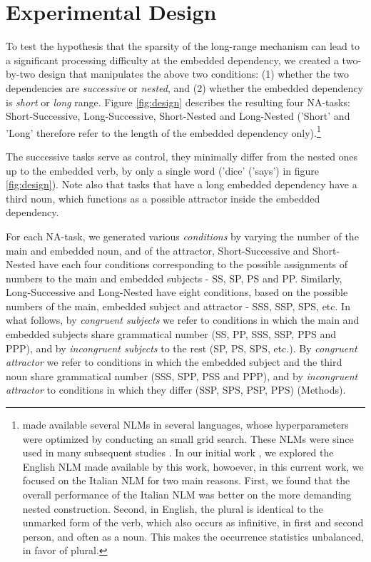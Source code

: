 \section{Experimental Design}
To test the hypothesis that the sparsity of the long-range mechanism can lead to a significant processing difficulty at the embedded dependency, we created a two-by-two design that manipulates the above two conditions: (1) whether the two dependencies are \textit{successive} or \textit{nested}, and (2) whether the embedded dependency is \textit{short} or \textit{long} range. Figure \ref{fig:design} describes the resulting four NA-tasks: Short-Successive, Long-Successive, Short-Nested and Long-Nested ('Short' and 'Long' therefore refer to the length of the embedded dependency only).\footnote{\citet{Gulordava:etal:2018} made available several NLMs in several languages, whose hyperparameters were optimized by conducting an small grid search. 
These NLMs were since used in many subsequent studies \citep{}. In our initial work \citep{lakretz2019emergence}, we explored the English NLM made available by this work, howoever, in this current work, we focused on the Italian NLM for two main reasons. First, we found that the overall performance of the Italian NLM was better on the more demanding nested construction. Second, in English, the plural is identical to the unmarked form of the verb, which also occurs as infinitive, in first and second person, and often as a noun. This makes the occurrence statistics unbalanced, in favor of plural.} 

The successive tasks serve as control, they minimally differ from the nested ones up to the embedded verb, by only a single word ('dice' ('says') in figure \ref{fig:design}). Note also that tasks that have a long embedded dependency have a third noun, which functions as a possible attractor inside the embedded dependency.

For each NA-task, we generated various \textit{conditions} by varying the number of the main and embedded noun, and of the attractor, Short-Successive and Short-Nested have each four conditions corresponding to the possible assignments of numbers to the main and embedded subjects - SS, SP, PS and PP. Similarly, Long-Successive and Long-Nested have eight conditions, based on the possible numbers of the main, embedded subject and attractor - SSS, SSP, SPS, etc. In what follows, by \textit{congruent subjects} we refer to conditions in which the main and embedded subjects share grammatical number (SS, PP, SSS, SSP, PPS and PPP), and by \textit{incongruent subjects} to the rest (SP, PS, SPS, etc.). By \textit{congruent attractor} we refer to conditions in which the embedded subject and the third noun share grammatical number (SSS, SPP, PSS and PPP), and by \textit{incongruent attractor} to conditions in which they differ (SSP, SPS, PSP, PPS) (Methods). 

